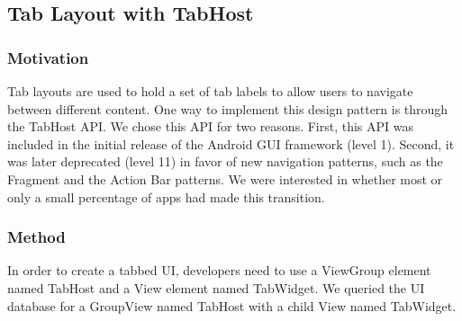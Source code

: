 \subsection{Tab Layout with TabHost}

\subsubsection{Motivation}
Tab layouts are used to hold a set of tab labels to allow users to navigate between different content. 
One way to implement this design pattern is through the TabHost API. 
We chose this API for two reasons. 
First, this API was included in the initial release of the Android GUI framework (level 1). 
Second, it was later deprecated (level 11) in favor of new navigation patterns, such as the Fragment and the Action Bar patterns. 
We were interested in whether most or only a small percentage of apps had made this transition.

\subsubsection{Method}
In order to create a tabbed UI, developers need to use a ViewGroup element named TabHost and a View element named TabWidget. 
We queried the UI database for a GroupView named TabHost with a child View named TabWidget.
